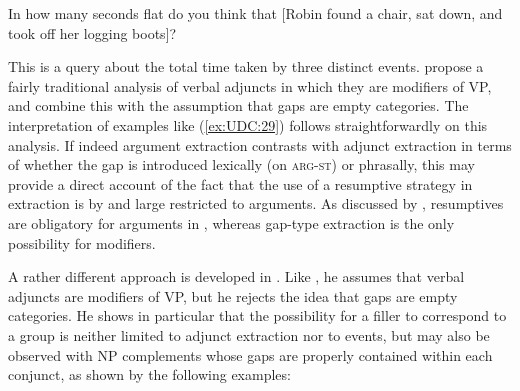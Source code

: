 \documentclass[output=paper,biblatex,babelshorthands,newtxmath,draftmode,colorlinks,citecolor=brown]{langscibook}
\begin{document}
\begin{exe}
\ex \label{ex:UDC:29}
In how many seconds flat do you think that [Robin found a chair,
sat down, and took off her logging boots]?
\end{exe}

\noindent
This is a query about the total time taken by three distinct events.
\citeauthor{Levine:Hukari:06} propose a fairly traditional analysis of verbal
adjuncts in which they are modifiers of VP, and combine this with the
assumption that gaps are empty categories. The interpretation of
examples like (\ref{ex:UDC:29}) follows straightforwardly on this
analysis. If indeed argument extraction contrasts with adjunct
extraction in terms of whether the gap is introduced  lexically (on
\textsc{arg-st}) or phrasally, this may
provide a direct account of the fact that the use of a resumptive
strategy in extraction is by and large restricted to arguments. As
discussed by \citet{Crysmann:Reintges:14}, resumptives are obligatory
for arguments in , whereas gap-type extraction is the only
possibility for modifiers.
 

A rather different approach is developed in \citet{Chaves:09}. Like
\citet[Chapter~3]{Levine:Hukari:06}, he assumes that verbal adjuncts are
modifiers of VP, but he rejects the idea that gaps are empty
categories. He shows in particular that the possibility for a filler
to correspond to a group is neither limited to adjunct extraction nor
to events, but may also be observed with NP complements whose gaps are
properly contained within each conjunct, as shown by the following
examples:

\begin{exe} \ex \begin{xlist} \label{ex:UDC:31}


\end{xlist}
\end{exe}

\end{document}
